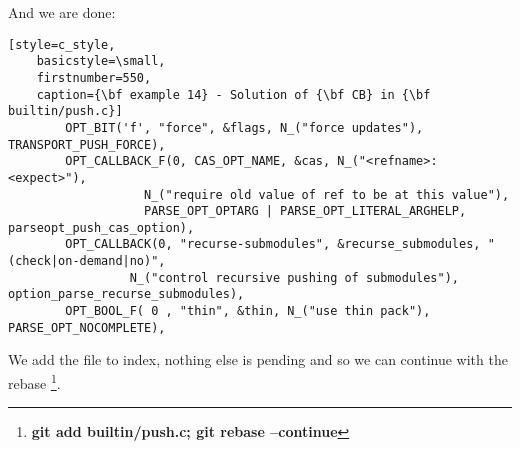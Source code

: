 And we are done:
\begin{lstlisting}[style=c_style,
	basicstyle=\small,
	firstnumber=550,
	caption={\bf example 14} - Solution of {\bf CB} in {\bf builtin/push.c}]
		OPT_BIT('f', "force", &flags, N_("force updates"), TRANSPORT_PUSH_FORCE),
		OPT_CALLBACK_F(0, CAS_OPT_NAME, &cas, N_("<refname>:<expect>"),
			       N_("require old value of ref to be at this value"),
			       PARSE_OPT_OPTARG | PARSE_OPT_LITERAL_ARGHELP, parseopt_push_cas_option),
		OPT_CALLBACK(0, "recurse-submodules", &recurse_submodules, "(check|on-demand|no)",
			     N_("control recursive pushing of submodules"), option_parse_recurse_submodules),
		OPT_BOOL_F( 0 , "thin", &thin, N_("use thin pack"), PARSE_OPT_NOCOMPLETE),
\end{lstlisting}

We add the file to index, nothing else is pending and so we can continue with the rebase
\footnote{{\bf git add builtin/push.c; git rebase --continue}}.


